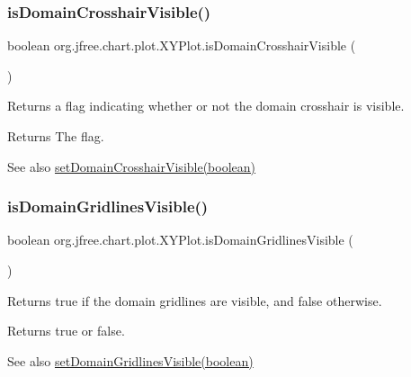 \subsubsection{\texorpdfstring{is\+Domain\+Crosshair\+Visible()}{isDomainCrosshairVisible()}}
{\footnotesize\ttfamily boolean org.\+jfree.\+chart.\+plot.\+X\+Y\+Plot.\+is\+Domain\+Crosshair\+Visible (\begin{DoxyParamCaption}{ }\end{DoxyParamCaption})}

Returns a flag indicating whether or not the domain crosshair is visible.

\begin{DoxyReturn}{Returns}
The flag.
\end{DoxyReturn}
\begin{DoxySeeAlso}{See also}
\mbox{\hyperlink{classorg_1_1jfree_1_1chart_1_1plot_1_1_x_y_plot_afccb957d4967c1b414c051328124efcb}{set\+Domain\+Crosshair\+Visible(boolean)}} 
\end{DoxySeeAlso}
\mbox{\label{classorg_1_1jfree_1_1chart_1_1plot_1_1_x_y_plot_a7b58c4b7a9e1a4eb424ff0bc9ce7e99c}} 
\subsubsection{\texorpdfstring{is\+Domain\+Gridlines\+Visible()}{isDomainGridlinesVisible()}}
{\footnotesize\ttfamily boolean org.\+jfree.\+chart.\+plot.\+X\+Y\+Plot.\+is\+Domain\+Gridlines\+Visible (\begin{DoxyParamCaption}{ }\end{DoxyParamCaption})}

Returns {\ttfamily true} if the domain gridlines are visible, and {\ttfamily false} otherwise.

\begin{DoxyReturn}{Returns}
{\ttfamily true} or {\ttfamily false}.
\end{DoxyReturn}
\begin{DoxySeeAlso}{See also}
\mbox{\hyperlink{classorg_1_1jfree_1_1chart_1_1plot_1_1_x_y_plot_aa7eee9b7aba042d305ebd83d927b8cb7}{set\+Domain\+Gridlines\+Visible(boolean)}} 
\end{DoxySeeAlso}
\mbox{\label{classorg_1_1jfree_1_1chart_1_1plot_1_1_x_y_plot_a90a77c4453eaa2e5f90b08285bdcc457}} 
